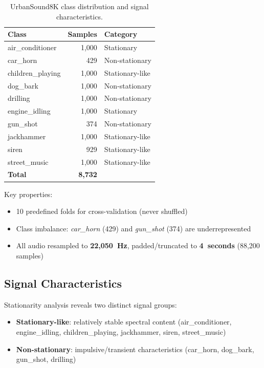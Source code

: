 \documentclass[conference]{IEEEtran}
\begin{document}
\begin{table}[htbp]
\centering
\caption{UrbanSound8K class distribution and signal characteristics.}
\label{tab:dataset}
\begin{tabular}{@{}lrl@{}}
\toprule
\textbf{Class} & \textbf{Samples} & \textbf{Category} \\
\midrule
air\_conditioner   & 1,000 & Stationary \\
car\_horn          & 429   & Non-stationary \\
children\_playing  & 1,000 & Stationary-like \\
dog\_bark          & 1,000 & Non-stationary \\
drilling           & 1,000 & Non-stationary \\
engine\_idling     & 1,000 & Stationary \\
gun\_shot          & 374   & Non-stationary \\
jackhammer         & 1,000 & Stationary-like \\
siren              & 929   & Stationary-like \\
street\_music      & 1,000 & Stationary-like \\
\midrule
\textbf{Total}     & \textbf{8,732} & \\
\bottomrule
\end{tabular}
\end{table}

Key properties:
\begin{itemize}
    \item 10 predefined folds for cross-validation (never shuffled)
    \item Class imbalance: \textit{car\_horn} (429) and \textit{gun\_shot} (374) are underrepresented
    \item All audio resampled to \textbf{22,050~Hz}, padded/truncated to \textbf{4~seconds} (88,200 samples)
\end{itemize}

\subsection{Signal Characteristics}

Stationarity analysis reveals two distinct signal groups:
\begin{itemize}
    \item \textbf{Stationary-like}: relatively stable spectral content (air\_conditioner, engine\_idling, children\_playing, jackhammer, siren, street\_music)
    \item \textbf{Non-stationary}: impulsive/transient characteristics (car\_horn, dog\_bark, gun\_shot, drilling)
\end{itemize}
\end{document}

